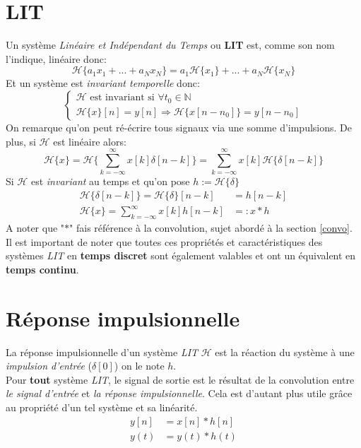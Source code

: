 \documentclass{report}
\begin{document}
\section{LIT}
Un système \textit{Linéaire et Indépendant du Temps} ou \textbf{LIT} est, comme son nom l'indique, linéaire donc:
\begin{equation}
\mathcal{H}\{a_1x_1 + ... + a_Nx_N\} = a_1\mathcal{H}\{x_1\} + ... + a_N\mathcal{H}\{x_N\} 
\end{equation}
Et un système est \textit{invariant temporelle} donc:
\begin{equation}
\begin{cases}
\mathcal{H} \text{ est invariant si } \forall t_0 \in \mathbb{N}\\
\mathcal{H}\{x\}[n] = y[n] \Rightarrow \mathcal{H}\{x[n-n_0]\} = y[n-n_0]
\end{cases}
\end{equation}
On remarque qu'on peut ré-écrire tous signaux via une somme d'impulsions. De plus, si $\mathcal{H}$ est linéaire alors:
\begin{equation}
\mathcal{H}\{x\} = \mathcal{H}\biggl\{\sum_{k= -\infty}^{\infty} x[k]\delta[n-k] \biggl\} = \sum_{k=-\infty}^{\infty} x[k]\mathcal{H}\{\delta[n-k]\}
\end{equation}
Si $\mathcal{H}$ est \textit{invariant} au temps et qu'on pose $h := \mathcal{H}\{\delta\}$
\begin{align*}
\mathcal{H}\{\delta[n-k]\} = \mathcal{H}\{\delta\}[n-k] &= h[n-k]\\
\mathcal{H}\{x\} = \sum_{k=-\infty}^{\infty} x[k]h[n-k] &=: x \ast h
\end{align*}
A noter que "$\ast$" fais référence à la convolution, sujet abordé à la section \ref{convo}.\\

Il est important de noter que toutes ces propriétés et caractéristiques des systèmes \textit{LIT} en \textbf{temps discret} sont également valables et ont un équivalent en \textbf{temps continu}.


\section{Réponse impulsionnelle}
La réponse impulsionnelle d'un système \textit{LIT} $\mathcal{H}$ est la réaction du système à une \textit{impulsion d'entrée} ($\delta[0]$) on le note $h$.\\

Pour \textbf{tout} système \textit{LIT}, le signal de sortie est le résultat de la convolution entre \textit{le signal d'entrée} et \textit{la réponse impulsionnelle}. Cela est d'autant plus utile grâce au propriété d'un tel système et sa linéarité.
\begin{align}
y[n] &= x[n] \ast h[n]\\
y(t) &= y(t) \ast h(t)
\end{align}
\end{document}
